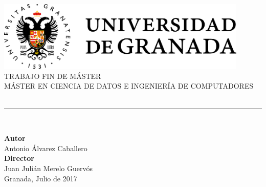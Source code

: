\begin{titlepage}


\newlength{\centeroffset}
\setlength{\centeroffset}{-0.5\oddsidemargin}
\addtolength{\centeroffset}{0.5\evensidemargin}
\thispagestyle{empty}

\noindent\hspace*{\centeroffset}\begin{minipage}{\textwidth}

\centering
\includegraphics[width=0.9\textwidth]{imagenes/logo_ugr.png}\\[1.4cm]

\textsc{ \Large TRABAJO FIN DE MÁSTER\\[0.2cm]}
\textsc{ MÁSTER EN CIENCIA DE DATOS E INGENIERÍA DE COMPUTADORES}\\[1cm]
%
{\Huge\bfseries \myTitle\\
}
\noindent\rule[-1ex]{\textwidth}{3pt}\\[3.5ex]
\end{minipage}

\vspace{2.0cm}
\noindent\hspace*{\centeroffset}\begin{minipage}{\textwidth}
\centering

\textbf{Autor}\\ {Antonio Álvarez Caballero}\\[2.5ex]
\textbf{Director}\\
{Juan Julián Merelo Guervós}\\[2cm]

Granada, Julio de 2017
\end{minipage}
\end{titlepage}
